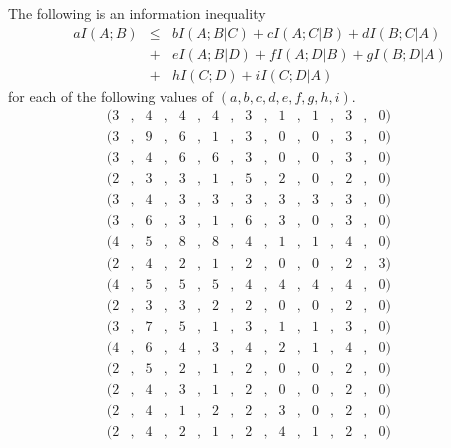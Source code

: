 \documentclass[10pt,journal]{IEEEtran}
\begin{document}
\begin{theorem}  \label{thm:many-inequalities}
The following is an information inequality
\begin{eqnarray*}
aI(A;B) &\leq& bI(A;B|C) + cI(A;C|B) + dI(B;C|A) \\
      &+&  eI(A;B|D) + fI(A;D|B)+ gI(B;D|A)\\
      &+& hI(C;D) + iI(C;D|A)
\end{eqnarray*}
for each of the following values of $(a,b,c,d,e,f,g,h,i)$.
\begin{align}
&&(3&,&4&,&4&,&4&,&3&,&1&,&1&,&3&,&0)&&&& \label{ineq3.1} \\
&&(3&,&9&,&6&,&1&,&3&,&0&,&0&,&3&,&0)&&&& \label{ineq3.2}\\
&&(3&,&4&,&6&,&6&,&3&,&0&,&0&,&3&,&0)&&&& \label{ineq3.3}\\
&&(2&,&3&,&3&,&1&,&5&,&2&,&0&,&2&,&0)&&&& \label{ineq3.4}\\
&&(3&,&4&,&3&,&3&,&3&,&3&,&3&,&3&,&0)&&&& \label{ineq3.5}\\
&&(3&,&6&,&3&,&1&,&6&,&3&,&0&,&3&,&0)&&&& \label{ineq3.6}\\
&&(4&,&5&,&8&,&8&,&4&,&1&,&1&,&4&,&0)&&&& \label{ineq3.7}\\
&&(2&,&4&,&2&,&1&,&2&,&0&,&0&,&2&,&3)&&&& \label{ineq3.8}\\
&&(4&,&5&,&5&,&5&,&4&,&4&,&4&,&4&,&0)&&&& \label{ineq3.9}\\
&&(2&,&3&,&3&,&2&,&2&,&0&,&0&,&2&,&0)&&&& \label{ineq3.10}\\
&&(3&,&7&,&5&,&1&,&3&,&1&,&1&,&3&,&0)&&&& \label{ineq3.11}\\
&&(4&,&6&,&4&,&3&,&4&,&2&,&1&,&4&,&0)&&&& \label{ineq3.12}\\
&&(2&,&5&,&2&,&1&,&2&,&0&,&0&,&2&,&0)&&&& \label{ineq3.13}\\
&&(2&,&4&,&3&,&1&,&2&,&0&,&0&,&2&,&0)&&&& \label{ineq3.14}\\
&&(2&,&4&,&1&,&2&,&2&,&3&,&0&,&2&,&0)&&&& \label{ineq3.15}\\
&&(2&,&4&,&2&,&1&,&2&,&4&,&1&,&2&,&0)&&&& \label{ineq3.16}
\end{align}
\end{theorem}
\end{document}

